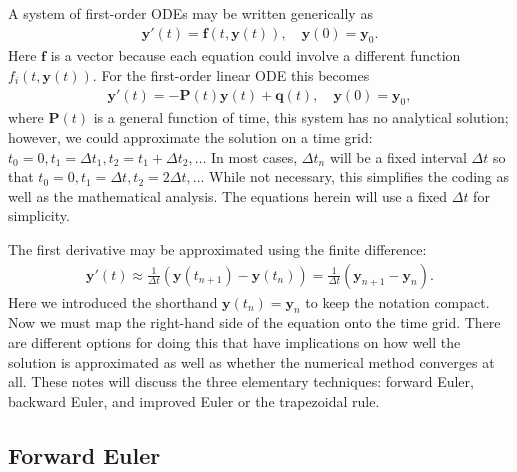 A system of first-order ODEs may be written generically as
\begin{align}
  \mathbf{y}'(t) = \mathbf{f}( t, \mathbf{y}(t) ), \quad \mathbf{y}(0) = \mathbf{y}_0.
\end{align}
Here $\mathbf{f}$ is a vector because each equation could involve a different function $f_i(t,\mathbf{y}(t))$. For the first-order linear ODE this becomes
\begin{align}
  \mathbf{y}'(t) = -\mathbf{P}(t) \mathbf{y}(t) + \mathbf{q}(t), \quad \mathbf{y}(0) = \mathbf{y}_0,
\end{align}
where $\mathbf{P}(t)$ is a general function of time, this system has no analytical solution; however, we could approximate the solution on a time grid: $t_0 = 0, t_1 = \Delta t_1, t_2 = t_1 + \Delta t_2, \ldots$ In most cases, $\Delta t_n$ will be a fixed interval $\Delta t$ so that $t_0 = 0, t_1 = \Delta t, t_2 = 2 \Delta t, \ldots$  While not necessary, this simplifies the coding as well as the mathematical analysis. The equations herein will use a fixed $\Delta t$ for simplicity.

The first derivative may be approximated using the finite difference:
\begin{align}
  \mathbf{y}'(t) \approx \frac{1}{\Delta t} \left( \mathbf{y}(t_{n+1}) - \mathbf{y}(t_n) \right) = \frac{1}{\Delta t}  \left( \mathbf{y}_{n+1} - \mathbf{y}_n \right) .
\end{align}
Here we introduced the shorthand $\mathbf{y}(t_n) = \mathbf{y}_n$ to keep the notation compact. Now we must map the right-hand side of the equation onto the time grid. There are different options for doing this that have implications on how well the solution is approximated as well as whether the numerical method converges at all. These notes will discuss the three elementary techniques: forward Euler, backward Euler, and improved Euler or the trapezoidal rule.

\subsection{Forward Euler}

